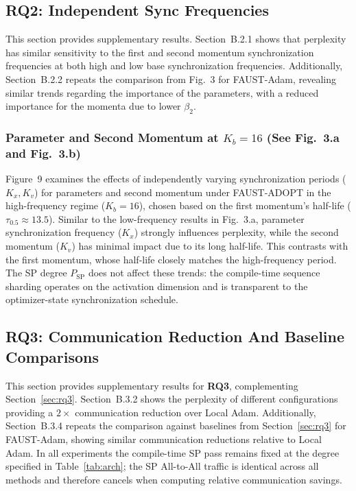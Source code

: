 \documentclass{article}
\begin{document}
\subsection{RQ2: Independent Sync Frequencies}
\label{sec:b2_sync_freq}

This section provides supplementary results. Section~B.2.1 shows that perplexity has similar sensitivity to the first and second momentum synchronization frequencies at both high and low base synchronization frequencies. Additionally, Section~B.2.2 repeats the comparison from Fig.~3 for FAUST-Adam, revealing similar trends regarding the importance of the parameters, with a reduced importance for the momenta due to lower $\beta_2$.

\subsubsection{Parameter and Second Momentum at \texorpdfstring{$K_b=16$}{Kb=16} (See Fig.~3.a and Fig.~3.b)}
\label{sec:b21_param_second}

Figure~9 examines the effects of independently varying synchronization periods ($K_x, K_v$) for parameters and second momentum under FAUST-ADOPT in the high-frequency regime ($K_b=16$), chosen based on the first momentum's half-life ($\tau_{0.5}\approx 13.5$). Similar to the low-frequency results in Fig.~3.a, parameter synchronization frequency ($K_x$) strongly influences perplexity, while the second momentum ($K_v$) has minimal impact due to its long half-life. This contrasts with the first momentum, whose half-life closely matches the high-frequency period. The SP degree $P_{\text{SP}}$ does not affect these trends: the compile-time sequence sharding operates on the activation dimension and is transparent to the optimizer-state synchronization schedule.

\subsection{RQ3: Communication Reduction And Baseline Comparisons}
\label{sec:b3_comm_reduction}

This section provides supplementary results for \textbf{RQ3}, complementing Section~\ref{sec:rq3}. Section~B.3.2 shows the perplexity of different configurations providing a $2\times$ communication reduction over Local Adam. Additionally, Section~B.3.4 repeats the comparison against baselines from Section~\ref{sec:rq3} for FAUST-Adam, showing similar communication reductions relative to Local Adam. In all experiments the compile-time SP pass remains fixed at the degree specified in Table~\ref{tab:arch}; the SP All-to-All traffic is identical across all methods and therefore cancels when computing relative communication savings.
\end{document}
